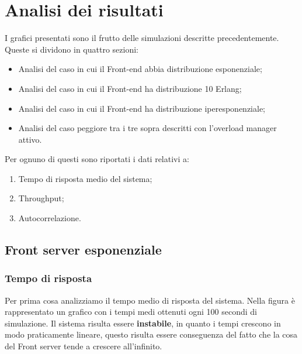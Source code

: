 \chapter{Analisi dei risultati}

I grafici presentati sono il frutto delle simulazioni descritte precedentemente. Queste si dividono in quattro sezioni:

\begin{itemize}
 \item Analisi del caso in cui il Front-end abbia distribuzione esponenziale;
 \item Analisi del caso in cui il Front-end ha distribuzione 10 Erlang;
 \item Analisi del caso in cui il Front-end ha distribuzione iperesponenziale;
 \item Analisi del caso peggiore tra i tre sopra descritti con l'overload manager attivo.
\end{itemize}

\noindent Per ognuno di questi sono riportati i dati relativi a:
\begin{enumerate}
 \item Tempo di risposta medio del sistema;
 \item Throughput;
 \item Autocorrelazione.
\end{enumerate}

\section{Front server esponenziale}

\subsection{Tempo di risposta}
Per prima cosa analizziamo il tempo medio di risposta del sistema. Nella figura è rappresentato un grafico con i tempi medi ottenuti ogni 100 secondi di simulazione. Il sistema risulta essere \textbf{instabile}, in quanto i tempi crescono in modo praticamente lineare, questo risulta essere conseguenza del fatto che la cosa del Front server tende a crescere all'infinito.

